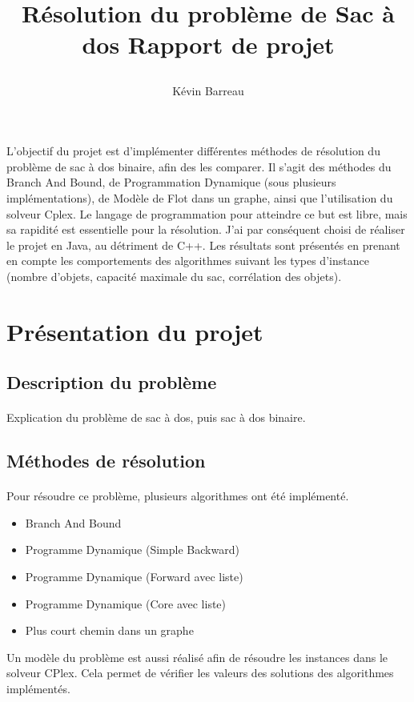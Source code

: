 \documentclass[12pt]{article}
\title{
 \begin{minipage}\linewidth
        \centering
        Résolution du problème de Sac à dos 
        \vskip3pt
        \large Rapport de projet
    \end{minipage}
 }
\author{Kévin Barreau}
\begin{document}
\maketitle

\abstract
L'objectif du projet est d'implémenter différentes méthodes de résolution du problème de sac à dos binaire, afin des les comparer. Il s'agit des méthodes du Branch And Bound, de Programmation Dynamique (sous plusieurs implémentations), de Modèle de Flot dans un graphe, ainsi que l'utilisation du solveur Cplex. Le langage de programmation pour atteindre ce but est libre, mais sa rapidité est essentielle pour la résolution. J'ai par conséquent choisi de réaliser le projet en Java, au détriment de C++. Les résultats sont présentés en prenant en compte les comportements des algorithmes suivant les types d'instance (nombre d'objets, capacité maximale du sac, corrélation des objets).

\newpage

\renewcommand{\contentsname}{Sommaire} 
\tableofcontents

\newpage

\section{Présentation du projet}

\subsection{Description du problème}

\paragraph{}Explication du problème de sac à dos, puis sac à dos binaire.

\subsection{Méthodes de résolution}

\paragraph{}Pour résoudre ce problème, plusieurs algorithmes ont été implémenté.
\begin{itemize}
	\item Branch And Bound
	\item Programme Dynamique (Simple Backward)
	\item Programme Dynamique (Forward avec liste)
	\item Programme Dynamique (Core avec liste)
	\item Plus court chemin dans un graphe
\end{itemize}
Un modèle du problème est aussi réalisé afin de résoudre les instances dans le solveur CPlex. Cela permet de vérifier les valeurs des solutions des algorithmes implémentés.
\end{document}
